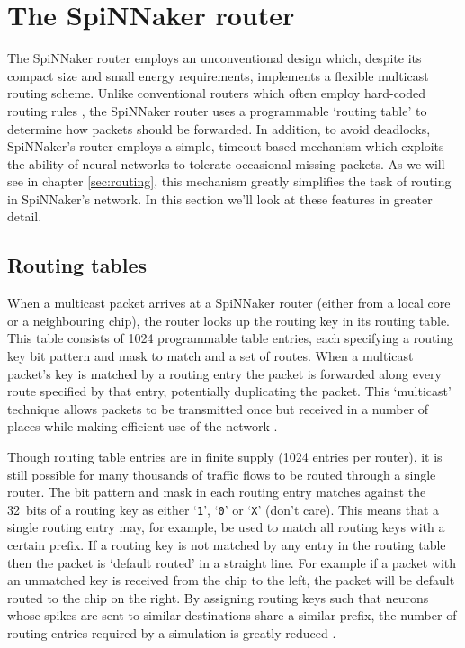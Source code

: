 	\section{The SpiNNaker router}
		
		The SpiNNaker router employs an unconventional design which, despite its
		compact size and small energy requirements, implements a flexible multicast
		routing scheme. Unlike conventional routers which often employ hard-coded
		routing rules \cite[chapter~8]{dally04}, the SpiNNaker router uses a
		programmable `routing table' to determine how packets should be forwarded.
		In addition, to avoid deadlocks, SpiNNaker's router employs a simple,
		timeout-based mechanism which exploits the ability of neural networks to
		tolerate occasional missing packets. As we will see in chapter
		\ref{sec:routing}, this mechanism greatly simplifies the task of routing in
		SpiNNaker's network. In this section we'll look at these features in
		greater detail.
		
		\subsection{Routing tables}
		
			When a multicast packet arrives at a SpiNNaker router (either from a
			local core or a neighbouring chip), the router looks up the routing key
			in its routing table. This table consists of \num{1024} programmable
			table entries, each specifying a routing key bit pattern and mask to
			match and a set of routes.  When a multicast packet's key is matched by a
			routing entry the packet is forwarded along every route specified by that
			entry, potentially duplicating the packet. This `multicast' technique
			allows packets to be transmitted once but received in a number of places
			while making efficient use of the network \cite{navaridas12}.
			
			Though routing table entries are in finite supply (\num{1024} entries per
			router), it is still possible for many thousands of traffic flows to be
			routed through a single router. The bit pattern and mask in each routing
			entry matches against the 32~bits of a routing key as either
			`\texttt{1}', `\texttt{0}' or `\texttt{X}' (don't care).  This means that
			a single routing entry may, for example, be used to match all routing
			keys with a certain prefix. If a routing key is not matched by any entry
			in the routing table then the packet is `default routed' in a straight
			line. For example if a packet with an unmatched key is received from the
			chip to the left, the packet will be default routed to the chip on the
			right. By assigning routing keys such that neurons whose spikes are sent
			to similar destinations share a similar prefix, the number of routing
			entries required by a simulation is greatly reduced \cite{davies12}.
			
